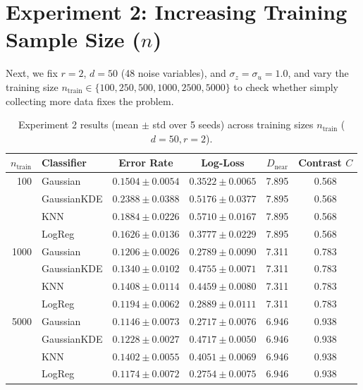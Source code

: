 \documentclass[11pt, a4paper]{article}
\begin{document}
\section{Experiment 2: Increasing Training Sample Size ($n$)}

Next, we fix $r = 2$, $d = 50$ (48 noise variables), and $\sigma_z = \sigma_u = 1.0$, and vary the training size $n_{\text{train}} \in \{100, 250, 500, 1000, 2500, 5000\}$ to check whether simply collecting more data fixes the problem.

\begin{table}[htbp]
\centering
\small
\caption{Experiment 2 results (mean $\pm$ std over 5 seeds) across training sizes $n_{\text{train}}$ ($d=50, r=2$).}
\label{tab:exp2}
\begin{tabular}{rlcccc}
\toprule
$n_{\text{train}}$ & Classifier & Error Rate & Log-Loss & $D_{\text{near}}$ & Contrast $C$ \\
\midrule
100  & Gaussian    & $0.1504 \pm 0.0054$ & $0.3522 \pm 0.0065$ & 7.895 & 0.568 \\
     & GaussianKDE & $0.2388 \pm 0.0388$ & $0.5176 \pm 0.0377$ & 7.895 & 0.568 \\
     & KNN         & $0.1884 \pm 0.0226$ & $0.5710 \pm 0.0167$ & 7.895 & 0.568 \\
     & LogReg      & $0.1626 \pm 0.0136$ & $0.3777 \pm 0.0229$ & 7.895 & 0.568 \\
\midrule
1000 & Gaussian    & $0.1206 \pm 0.0026$ & $0.2789 \pm 0.0090$ & 7.311 & 0.783 \\
     & GaussianKDE & $0.1340 \pm 0.0102$ & $0.4755 \pm 0.0071$ & 7.311 & 0.783 \\
     & KNN         & $0.1408 \pm 0.0114$ & $0.4459 \pm 0.0080$ & 7.311 & 0.783 \\
     & LogReg      & $0.1194 \pm 0.0062$ & $0.2889 \pm 0.0111$ & 7.311 & 0.783 \\
\midrule
5000 & Gaussian    & $0.1146 \pm 0.0073$ & $0.2717 \pm 0.0076$ & 6.946 & 0.938 \\
     & GaussianKDE & $0.1228 \pm 0.0027$ & $0.4717 \pm 0.0050$ & 6.946 & 0.938 \\
     & KNN         & $0.1402 \pm 0.0055$ & $0.4051 \pm 0.0069$ & 6.946 & 0.938 \\
     & LogReg      & $0.1174 \pm 0.0072$ & $0.2754 \pm 0.0075$ & 6.946 & 0.938 \\
\bottomrule
\end{tabular}
\end{table}
\end{document}
